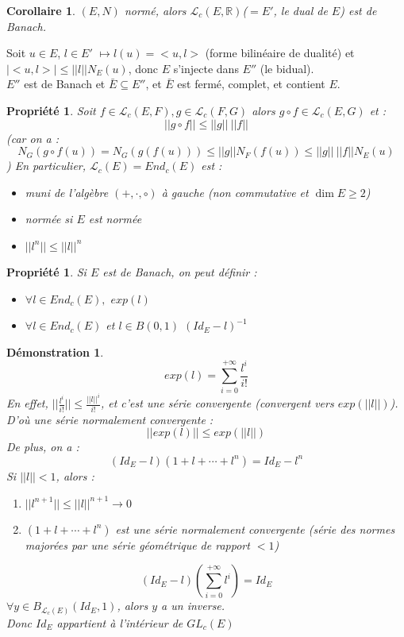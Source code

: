 \documentclass[a4paper, oneside]{report}
\theoremstyle{break}
\newtheorem{propr}[thm]{Propriété}
\newtheorem{cor}[thm]{Corollaire}
\newtheorem*{demo}{Démonstration}
\newcommand{\R}{\mathbb{R}}
\renewcommand{\L}{\mathcal{L}}
\begin{document}
\begin{cor}
$(E,N)$ normé, alors $\L_c(E,\R)$($=E'$, le dual de $E$) est de Banach.
\end{cor}

Soit $u\in E$, $l\in E'$ $\mapsto l(u)=<u,l>$ (forme bilinéaire de dualité) et $|<u,l>|\leq ||l||N_E(u)$, donc $E$ s'injecte dans $E''$ (le bidual).\\
$E''$ est de Banach et $\bar{E} \subseteq E''$, et $\bar{E}$ est fermé, complet, et contient $E$.

\begin{propr}
Soit $f\in \L_c(E,F), g\in \L_c(F,G)$ alors $g\circ f\in \L_c(E,G)$ et :
$$||g\circ f|| \leq  ||g||~||f||$$
(car on a :
$$N_G(g\circ f(u)) = N_G(g(f(u))) \leq ||g||N_F(f(u)) \leq ||g||~||f||N_E(u)$$
)
En particulier, $\L_c(E)=End_c(E)$ est :
\begin{itemize}
\item muni de l'algèbre $(+,\cdot, \circ)$ à gauche (non commutative et $\dim E\geq 2$)
\item normée si $E$ est normée
\item $||l^n||\leq ||l||^n$
\end{itemize} 
\end{propr}

\begin{propr}
\item Si $E$ est de Banach, on peut définir :
\begin{itemize}
\item $\forall l\in End_c(E),$ $exp(l)$
\item $\forall l\in End_c(E)$ et $l\in B(0,1)$ $(Id_E-l)^{-1}$
\end{itemize}
\end{propr}

\begin{demo}
$$exp(l)=\sum_{i=0}^{+\infty}\frac{l^i}{i!}$$
En effet, $||\frac{l^i}{i!}|| \leq \frac{||l||^i}{i!}$, et c'est une série convergente (convergent vers $exp(||l||)$).
D'où une série normalement convergente :
$$||exp(l)||\leq exp(||l||)$$
De plus, on a :
$$(Id_E-l)(1+l+\cdots+l^n)=Id_E-l^n$$
Si $||l||< 1$, alors :
\begin{enumerate}
\item $||l^{n+1}||\leq ||l||^{n+1}\rightarrow 0$
\item $(1+l+\cdots+l^n)$ est une série normalement convergente (série des normes majorées par une série géométrique de rapport $< 1$)
\end{enumerate}
$$(Id_E-l)(\sum_{i=0}^{+\infty}l^i)=Id_E$$
$\forall y\in B_{\L_c(E)}(Id_E,1)$, alors $y$ a un inverse.\\
Donc $Id_E$ appartient à l'intérieur de $GL_c(E)$
\end{demo}
\end{document}
